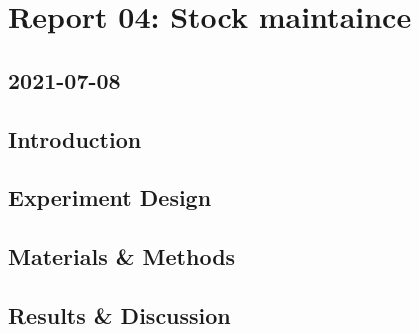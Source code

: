 \newpage
\section{Report 04: Stock maintaince}

\subsection*{2021-07-08}

\subsection{Introduction}


\subsection{Experiment Design}


\subsection{Materials \& Methods}


\subsection{Results \& Discussion}
